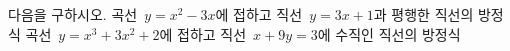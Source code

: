 다음을 구하시오.
 곡선~$y=x^2-3x$에 접하고 직선~$y=3x+1$과 평행한 직선의 방정식
 곡선~$y=x^3+3x^2+2$에 접하고 직선~$x+9y=3$에 수직인 직선의 방정식
